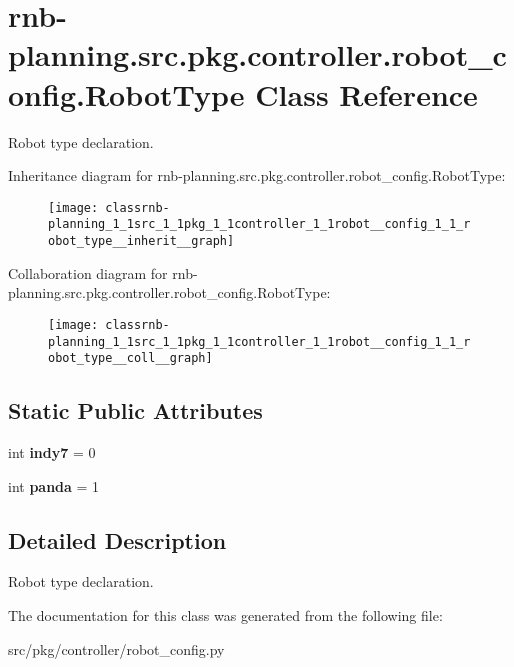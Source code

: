\hypertarget{classrnb-planning_1_1src_1_1pkg_1_1controller_1_1robot__config_1_1_robot_type}{}\section{rnb-\/planning.src.\+pkg.\+controller.\+robot\+\_\+config.\+Robot\+Type Class Reference}
\label{classrnb-planning_1_1src_1_1pkg_1_1controller_1_1robot__config_1_1_robot_type}


Robot type declaration.  




Inheritance diagram for rnb-\/planning.src.\+pkg.\+controller.\+robot\+\_\+config.\+Robot\+Type\+:
\nopagebreak
\begin{figure}[H]
\begin{center}
\leavevmode
\texttt{[image: classrnb-planning\_1\_1src\_1\_1pkg\_1\_1controller\_1\_1robot\_\_config\_1\_1\_robot\_type\_\_inherit\_\_graph]}
\end{center}
\end{figure}


Collaboration diagram for rnb-\/planning.src.\+pkg.\+controller.\+robot\+\_\+config.\+Robot\+Type\+:
\nopagebreak
\begin{figure}[H]
\begin{center}
\leavevmode
\texttt{[image: classrnb-planning\_1\_1src\_1\_1pkg\_1\_1controller\_1\_1robot\_\_config\_1\_1\_robot\_type\_\_coll\_\_graph]}
\end{center}
\end{figure}
\subsection*{Static Public Attributes}
\begin{DoxyCompactItemize}
\item 
\mbox{\label{classrnb-planning_1_1src_1_1pkg_1_1controller_1_1robot__config_1_1_robot_type_a2ea99952cada8f9133c88c4d026a45aa}} 
int {\bfseries indy7} = 0
\item 
\mbox{\label{classrnb-planning_1_1src_1_1pkg_1_1controller_1_1robot__config_1_1_robot_type_a7579da07da0123ca88734411c241d786}} 
int {\bfseries panda} = 1
\end{DoxyCompactItemize}


\subsection{Detailed Description}
Robot type declaration. 

The documentation for this class was generated from the following file\+:\begin{DoxyCompactItemize}
\item 
src/pkg/controller/robot\+\_\+config.\+py\end{DoxyCompactItemize}
